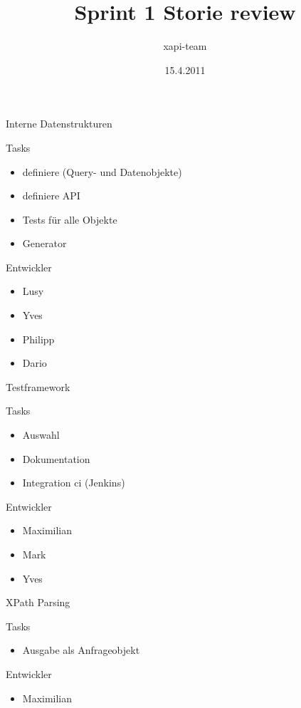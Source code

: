 \documentclass{beamer}
\title{Sprint 1 Storie review}
\author{xapi-team}
\institute{Institute for Computer Science, Free University Berlin}
\date{15.4.2011}
\begin{document}
\begin{frame}
\titlepage
\end{frame}

\begin{frame}{Interne Datenstrukturen}

    \begin{block}{Tasks}
        \begin{itemize}
        \item definiere (Query- und Datenobjekte)
        \item definiere API
        \item Tests für alle Objekte
        \item Generator
        \end{itemize}
    \end{block}
    \begin{block}{Entwickler}
        \begin{itemize}
        \item Lusy
        \item Yves
        \item Philipp
        \item Dario
        \end{itemize}
    \end{block}

\end{frame}

\begin{frame}{Testframework}
    \begin{block}{Tasks}
        \begin{itemize}
        \item Auswahl
        \item Dokumentation
        \item Integration ci (Jenkins)
        \end{itemize}
    \end{block}
    \begin{block}{Entwickler}
        \begin{itemize}
        \item Maximilian
        \item Mark
        \item Yves
        \end{itemize}
    \end{block}

\end{frame}

\begin{frame}{XPath Parsing}
    \begin{block}{Tasks}
        \begin{itemize}
        \item Ausgabe als Anfrageobjekt
        \end{itemize}
    \end{block}
    \begin{block}{Entwickler}
        \begin{itemize}
        \item Maximilian
        \end{itemize}
    \end{block}

\end{frame}
\end{document}

